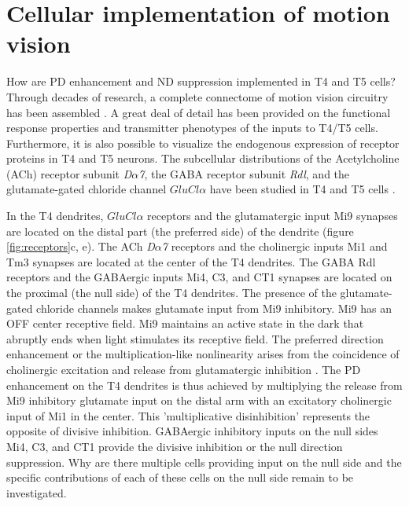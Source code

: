 \section{Cellular implementation of motion vision}
How are PD enhancement and ND suppression implemented in T4 and T5 cells?  Through decades of research, a complete connectome of motion vision circuitry has been assembled \parencite{Takemura2008, Takemura2017, Shinomiya2014, Shinomiya2019}. A great deal of detail has been provided on the functional response properties \parencite{Arenz2017, Drews2020, Strother2017, Serbe2016} and transmitter phenotypes \parencite{Davis2020, Pankova2017, Richter2018, Takemura2017} of the inputs to T4/T5 cells. Furthermore, it is also possible to visualize the endogenous expression of receptor proteins in T4 and T5 neurons. The subcellular distributions of the Acetylcholine (ACh) receptor subunit \textit{D$\alpha$7}, the GABA receptor subunit \textit{Rdl}, and the glutamate-gated chloride channel \textit{$GluCl\alpha$} have been studied in T4 and T5 cells \parencite{Fendl2020}.

In the T4 dendrites, \textit{$GluCl\alpha$} receptors and the glutamatergic input Mi9 synapses are located on the distal part (the preferred side) of the dendrite (figure \ref{fig:receptors}c, e). The ACh \textit{D$\alpha$7} receptors and the cholinergic inputs Mi1 and Tm3 synapses are located at the center of the T4 dendrites. The GABA Rdl receptors and the GABAergic inputs Mi4, C3, and CT1 synapses are located on the proximal (the null side) of the T4 dendrites. The presence of the glutamate-gated chloride channels makes glutamate input from Mi9 inhibitory. Mi9 has an OFF center receptive field. Mi9 maintains an active state in the dark that abruptly ends when light stimulates its receptive field. The preferred direction enhancement or the multiplication-like nonlinearity arises from the coincidence of cholinergic excitation and release from glutamatergic inhibition \parencite{Groschner2022}. The PD enhancement on the T4 dendrites is thus achieved by multiplying the release from Mi9 inhibitory glutamate input on the distal arm with an excitatory cholinergic input of Mi1 in the center. This 'multiplicative disinhibition' represents the opposite of divisive inhibition. GABAergic inhibitory inputs on the null sides Mi4, C3, and CT1 provide the divisive inhibition or the null direction suppression. Why are there multiple cells providing input on the null side and the specific contributions of each of these cells on the null side remain to be investigated.

